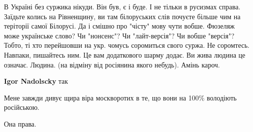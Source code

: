 В Україні без суржика нікуди. Він був, є і буде. І не тільки в русизмах
справа. Заїдьте колись на Рівненщину, ви там білоруських слів почуєте більше чим
на теріторії самої Білорусі. Да і смішно про "чісту" мову чути вобше. Фюзеляж
може українське слово? Чи "нонсенс"? Чи "лайт-версія"? Чи вобше "версія"?
Тобто, ті хто перейшовши на укр. чомусь соромиться свого суржа. Не
соромтесь. Навпаки, пишайтесь ним. Це вам додаткового шарму додає. Ви жива людина
це означає. Людина. (на відміну від росіянина якого небудь). Амінь кароч.

\begin{itemize} %
 
\textbf{Igor Nadolscky} так
\end{itemize} %

 
Мене завжди дивує щира віра москворотих в те, що вони на 100\% володіють російською.

 
Она права.

